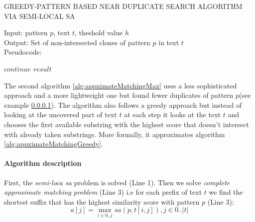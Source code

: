 \begin{algorithm}[H]
\caption{GREEDY-PATTERN BASED NEAR DUPLICATE
SEARCH ALGORITHM VIA SEMI-LOCAL SA}
\label{alg:appximateMatchingGreedy}
Input: pattern $p$, text $t$, theshold value $h$\\
Output: Set of non-intersected clones of pattern $p$ in text $t$\\
Pseudocode:
\begin{algorithmic}[1]
   	\ENDIF
   	\ENDIF
   	
   \ELSE 
   \STATE $continue$ 
   \ENDIF
\ENDWHILE
\RETURN $result$

\end{algorithmic}
\end{algorithm}


The second algorithm \ref{alg:appximateMatchingMax} uses a less sophisticated approach and a more lightweight one but found fewer duplicates of pattern $p$(see example \ref{}).
The algorithm also follows a greedy approach but instead of looking at the uncovered part of text $t$ at each step it looks at the text $t$ and chooses the first available substring with the highest score that doesn't intersect with already taken substrings.
More formally, it approximates algorithm \ref{alg:appximateMatchingGreedy}.

\paragraph{Algorithm description}
First, the \emph{semi-loca sa} problem is solved (Line 1).
Then we solve \emph{complete approximate matching problem} (Line 3) i.e
for each prefix of text $t$ we find the shortest suffix that has the highest similarity score with pattern $p$ (Line 3):
\begin{equation}
    a[j] = \max _{i \in 0 ..j} sa(p,t[i,j]), j \in 0..|t|
\end{equation}

